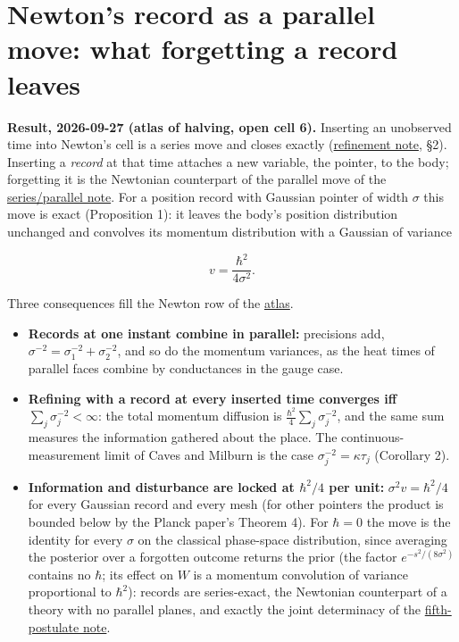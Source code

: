 \documentclass[11pt,a4paper]{article}
\newcommand{\tightlist}{\setlength{\itemsep}{0pt}\setlength{\parskip}{0pt}}
\begin{document}
\hypertarget{newtons-record-as-a-parallel-move-what-forgetting-a-record-leaves}{%
\section{Newton's record as a parallel move: what forgetting a record
leaves}\label{newtons-record-as-a-parallel-move-what-forgetting-a-record-leaves}}

\textbf{Result, 2026-09-27 (atlas of halving, open cell 6).} Inserting
an unobserved time into Newton's cell is a series move and closes
exactly (\href{refinement-composition-and-limit.md}{refinement note},
§2). Inserting a \emph{record} at that time attaches a new variable, the
pointer, to the body; forgetting it is the Newtonian counterpart of the
parallel move of the
\href{series-parallel-gauge-refinement.md}{series/parallel note}. For a
position record with Gaussian pointer of width \(\sigma\) this move is
exact (Proposition 1): it leaves the body's position distribution
unchanged and convolves its momentum distribution with a Gaussian of
variance

\[v=\frac{\hbar^2}{4\sigma^2}.\]

Three consequences fill the Newton row of the
\href{halving-atlas.md}{atlas}.

\begin{itemize}
\tightlist
\item
  \textbf{Records at one instant combine in parallel:} precisions add,
  \(\sigma^{-2}=\sigma_1^{-2}+\sigma_2^{-2}\), and so do the momentum
  variances, as the heat times of parallel faces combine by conductances
  in the gauge case.
\item
  \textbf{Refining with a record at every inserted time converges iff}
  \(\sum_j\sigma_j^{-2}<\infty\): the total momentum diffusion is
  \(\frac{\hbar^2}4\sum_j\sigma_j^{-2}\), and the same sum measures the
  information gathered about the place. The continuous-measurement limit
  of Caves and Milburn is the case \(\sigma_j^{-2}=\kappa\tau_j\)
  (Corollary 2).
\item
  \textbf{Information and disturbance are locked at \(\hbar^2/4\) per
  unit:} \(\sigma^2v=\hbar^2/4\) for every Gaussian record and every
  mesh (for other pointers the product is bounded below by the Planck
  paper's Theorem 4). For \(\hbar=0\) the move is the identity for every
  \(\sigma\) on the classical phase-space distribution, since averaging
  the posterior over a forgotten outcome returns the prior (the factor
  \(e^{-s^2/(8\sigma^2)}\) contains no \(\hbar\); its effect on \(W\) is
  a momentum convolution of variance proportional to \(\hbar^2\)):
  records are series-exact, the Newtonian counterpart of a theory with
  no parallel planes, and exactly the joint determinacy of the
  \href{principia-fifth-postulate.md}{fifth-postulate note}.
\end{itemize}
\end{document}
